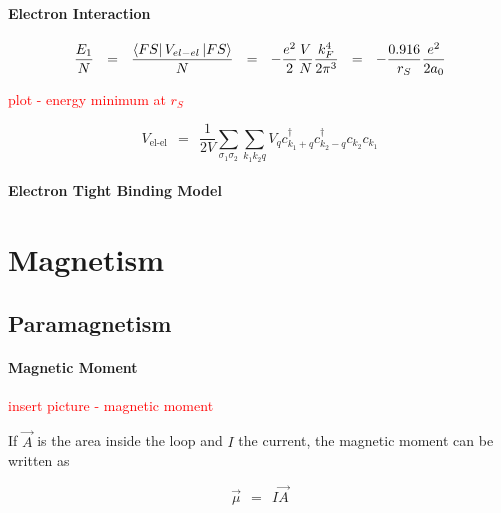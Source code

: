 \documentclass[10pt]{report}
\numberwithin{equation}{chapter}
\begin{document}
\subsubsection*{Electron Interaction}

\begin{equation*}
  \frac{E_1}{N} ~~ = ~~ \frac{\bra{FS} V_{el-el} \ket{FS}}{N} ~~ = ~~ 
  - \frac{e^2}{2} \frac{V}{N} \frac{k_F^4}{2 \pi^3} ~~=~~ - \frac{0.916}{r_S} \frac{e^2}{2 a_0}
\end{equation*}


\textcolor{red}{plot - energy minimum at $r_S$}


\begin{equation}
  V_\text{el-el} ~~=~~ \frac{1}{2V} \sum_{\sigma_1 \sigma_2} \sum_{k_1 k_2 q} 
    V_q c_{k_1+q}^\dag c_{k_2-q}^\dag c_{k_2} c_{k_1}
\end{equation}


\subsubsection{Electron Tight Binding Model}






\chapter{Magnetism}

\section{Paramagnetism}

\subsubsection{Magnetic Moment}

\textcolor{red}{insert picture - magnetic moment}

If $\vec{A}$ is the area inside the loop and $I$ the current, the magnetic moment can be written as

\begin{equation} \label{eq:mag_mom}
  \vec{\mu} ~~=~~ I \vec{A}
\end{equation}
\end{document}
